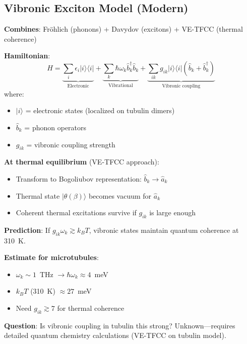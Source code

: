 \subsection{Vibronic Exciton Model (Modern)}\label{vibronic-exciton-model-modern}

\textbf{Combines}: Fröhlich (phonons) + Davydov (excitons) + VE-TFCC (thermal coherence)

\textbf{Hamiltonian}:
\begin{equation}
\label{eq:vibronic-hamiltonian}
\hat{H} = \underbrace{\sum_i \epsilon_i | i \rangle \langle i |}_{\text{Electronic}} + \underbrace{\sum_k \hbar \omega_k \hat{b}_k^\dagger \hat{b}_k}_{\text{Vibrational}} + \underbrace{\sum_{ik} g_{ik} | i \rangle \langle i | (\hat{b}_k + \hat{b}_k^\dagger)}_{\text{Vibronic coupling}}
\end{equation}
where:
\begin{itemize}
\item $| i \rangle$ = electronic states (localized on tubulin dimers)
\item $\hat{b}_k$ = phonon operators
\item $g_{ik}$ = vibronic coupling strength
\end{itemize}

\textbf{At thermal equilibrium} (VE-TFCC approach):
\begin{itemize}
\item Transform to Bogoliubov representation: $\hat{b}_k \rightarrow \hat{a}_k$
\item Thermal state $|\theta(\beta)\rangle$ becomes vacuum for $\hat{a}_k$
\item Coherent thermal excitations survive if $g_{ik}$ is large enough
\end{itemize}

\textbf{Prediction}: If $g_{ik} \omega_k \gtrsim k_B T$, vibronic states maintain quantum coherence at 310~K.

\textbf{Estimate for microtubules}:
\begin{itemize}
\item $\omega_k \sim 1$~THz $\rightarrow \hbar \omega_k \approx 4$~meV
\item $k_B T$ (310~K) $\approx 27$~meV
\item Need $g_{ik} \gtrsim 7$ for thermal coherence
\end{itemize}

\textbf{Question}: Is vibronic coupling in tubulin this strong? Unknown---requires detailed quantum chemistry calculations (VE-TFCC on tubulin model).


